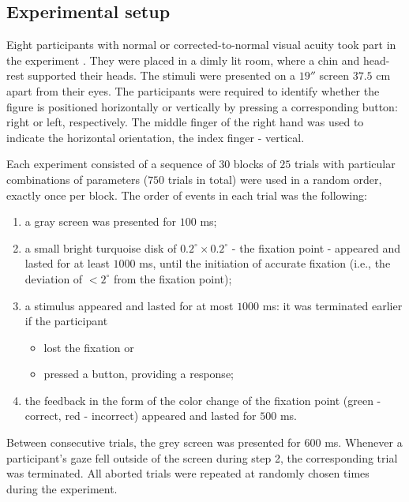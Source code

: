 \subsection{Experimental setup}

Eight participants with normal or corrected-to-normal visual acuity took part in the experiment \cite{MaryamPLACEHOLDER}. They were placed in a dimly lit room, where a chin and head-rest supported their heads. The stimuli were presented on a $19''$ screen $37.5$ cm apart from their eyes. The participants were required to identify whether the figure is positioned horizontally or vertically by pressing a corresponding button: right or left, respectively. The middle finger of the right hand was used to indicate the horizontal orientation, the index finger - vertical.

Each experiment consisted of a sequence of $30$ blocks of $25$ trials with particular combinations of parameters ($750$ trials in total) were used in a random order, exactly once per block. The order of events in each trial was the following:
\begin{enumerate}
    \item a gray screen was presented for $100$ ms;
    
    \item a small bright turquoise disk of $0.2^\circ \times 0.2^\circ$ - the fixation point - appeared and lasted for at least $1000$ ms, until the initiation of accurate fixation (i.e., the deviation of $< 2^\circ$ from the fixation point);
    
    \item a stimulus appeared and lasted for at most $1000$ ms: it was terminated earlier if the participant
    \begin{itemize}
        \item lost the fixation or
        \item pressed a button, providing a response;
    \end{itemize}
    
    \item the feedback in the form of the color change of the fixation point (green - correct, red - incorrect) appeared and lasted for $500$ ms.
\end{enumerate}
Between consecutive trials, the grey screen was presented for $600$ ms.  Whenever a participant's gaze fell outside of the screen during step 2, the corresponding trial was terminated. All aborted trials were repeated at randomly chosen times during the experiment.